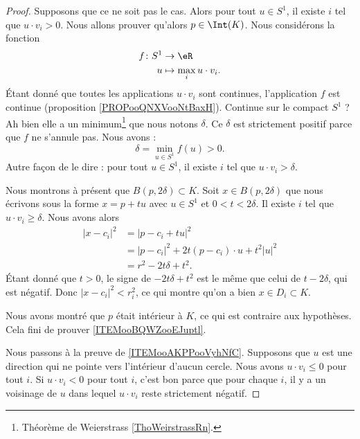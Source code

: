 \begin{proof}
	Supposons que ce ne soit pas le cas. Alors pour tout \( u\in S^1\), il existe \( i\) tel que \( u\cdot v_i>0\). Nous allons prouver qu'alors \( p\in\Int(K)\). Nous considérons la fonction
	\begin{equation}
		\begin{aligned}
			f\colon S^1 & \to \eR                    \\
			u           & \mapsto \max_i u\cdot v_i.
		\end{aligned}
	\end{equation}
	Étant donné que toutes les applications \( u\cdot v_i\) sont continues, l'application \( f\) est continue (proposition \ref{PROPooQNXVooNtBaxH}). Continue sur le compact \( S^1\) ? Ah bien elle a un minimum\footnote{Théorème de Weierstrass \ref{ThoWeirstrassRn}.} que nous notons \( \delta\). Ce \( \delta\) est strictement positif parce que \( f\) ne s'annule pas. Nous avons :
	\begin{equation}
		\delta=\min_{u\in S^1}f(u)>0.
	\end{equation}
	Autre façon de le dire : pour tout \( u\in S^1\), il existe \( i\) tel que \( u\cdot v_i>\delta\).

	Nous montrons à présent que \( B(p,2\delta)\subset K\). Soit \( x\in B(p,2\delta)\) que nous écrivons sous la forme \( x=p+tu\) avec \( u\in S^1\) et \( 0< t <2\delta\). Il existe \( i\) tel que \( u\cdot v_i\geq \delta\). Nous avons alors
	\begin{subequations}
		\begin{align}
			| x-c_i |^2 & =| p-c_i+tu |^2                          \\
			            & =| p-c_i |^2+2t(p-c_i)\cdot u+t^2| u |^2 \\
			            & =r^2-2t\delta+t^2.
		\end{align}
	\end{subequations}
	Étant donné que \( t>0\), le signe de \( -2t\delta+t^2\) est le même que celui de \( t-2\delta\), qui est négatif. Donc \( |x-c_i|^2<r_i^2\), ce qui montre qu'on a bien \( x\in D_i\subset K\).

	Nous avons montré que \( p\) était intérieur à \( K\), ce qui est contraire aux hypothèses. Cela fini de prouver \ref{ITEMooBQWZooEJuptl}.

	Nous passons à la preuve de \ref{ITEMooAKPPooVyhNfC}. Supposons que \( u\) est une direction qui ne pointe vers l'intérieur d'aucun cercle. Nous avons \( u\cdot v_i\leq 0\) pour tout \( i\). Si \( u\cdot v_i<0\) pour tout \( i\), c'est bon parce que pour chaque \( i\), il y a un voisinage de \( u\) dans lequel \( u\cdot v_i\) reste strictement négatif.


\end{proof}
